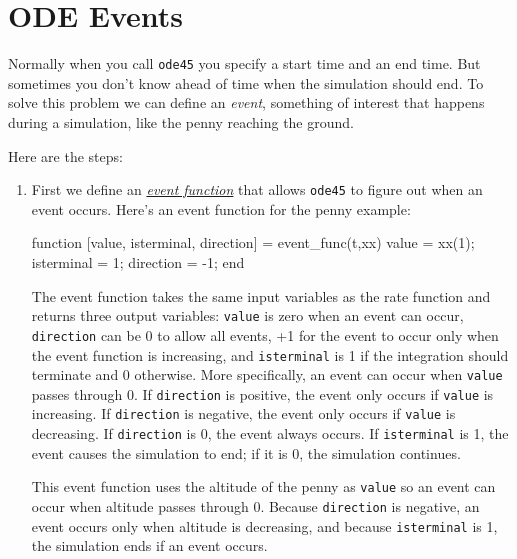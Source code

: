 \section{ODE Events}
\label{events}


Normally when you call \lstinline{ode45} you specify a start time and
an end time.  But sometimes you don't know ahead of time when the
simulation should end.  To solve this problem we can define an \emph{event},
something of interest that happens during a simulation,
like the penny reaching the ground.

Here are the steps:


\begin{enumerate}

\item First we define an \href{https://www.mathworks.com/help/matlab/math/ode-event-location.html}{\emph{event function}} that allows \lstinline{ode45} to figure out when
an event occurs.  Here's an event function for the penny example:

\begin{code}
function [value, isterminal, direction] = event_func(t,xx)
    value = xx(1);
    isterminal = 1;
    direction = -1;
end
\end{code}

The event function takes the same input variables as the rate function and returns three output variables: \lstinline{value} is zero when an event can occur, \lstinline{direction} can be 0 to allow all events, +1 for the event to occur only when the event function is increasing, and \lstinline{isterminal} is 1 if the integration should terminate and 0 otherwise. 
More specifically, an event can occur when \lstinline{value} passes through 0.
If \lstinline{direction} is positive, the event only occurs if \lstinline{value} is increasing.
 If \lstinline{direction} is negative, the event only occurs if \lstinline{value} is decreasing.
If \lstinline{direction} is 0, the event always occurs.
If \lstinline{isterminal} is 1, the event causes the simulation to end; if it is 0, the simulation continues.

This event function uses the altitude of the penny as \lstinline{value} so an event can occur when altitude passes through 0.
Because \lstinline{direction} is negative, an event occurs only when altitude is decreasing, and
because \lstinline{isterminal} is 1, the simulation ends if an event occurs.


\end{enumerate}
